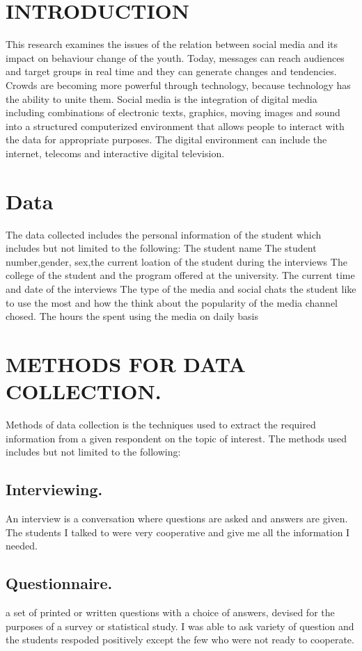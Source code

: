 \documentclass[12pt,A4paper]{article}
\begin{document}
\section{INTRODUCTION}
This research examines the issues of the relation between social media and its impact on 
behaviour change of the youth. Today, messages can reach audiences and target groups in real 
time and they can generate changes and tendencies. Crowds are becoming more powerful 
through technology, because technology has the ability to unite them.
Social media is the integration of digital media including combinations of electronic texts, 
graphics, moving images and sound into a structured computerized environment that allows 
people to interact with the data for appropriate purposes. The digital environment can include the 
internet, telecoms and interactive digital television.

 

\section{Data}
	
The data collected includes the personal information of the student which includes but not limited to the following:
The student name
The student number,gender, sex,the current loation of the student during the interviews
The college of the student and the program offered at the university.
The  current time and  date of the interviews
The type of the media and social chats the student like to use the most and how the think  about the popularity of the media channel chosed.
The hours the spent  using the media on daily basis

   
\section{METHODS FOR DATA COLLECTION.}
Methods of data collection is the techniques used to extract the required information from a given respondent on the topic of interest. The methods used includes but not limited to the following:
 

\subsection{Interviewing.}
An interview is a conversation where questions are asked and answers are given. The students I talked to were very cooperative and give me all the information I needed.
     
\subsection{Questionnaire.}
a set of printed or written questions with a choice of answers, devised for the purposes of a survey or statistical study. I was able to ask variety of question and the students respoded positively except the few who were not ready to cooperate.
\end{document}
